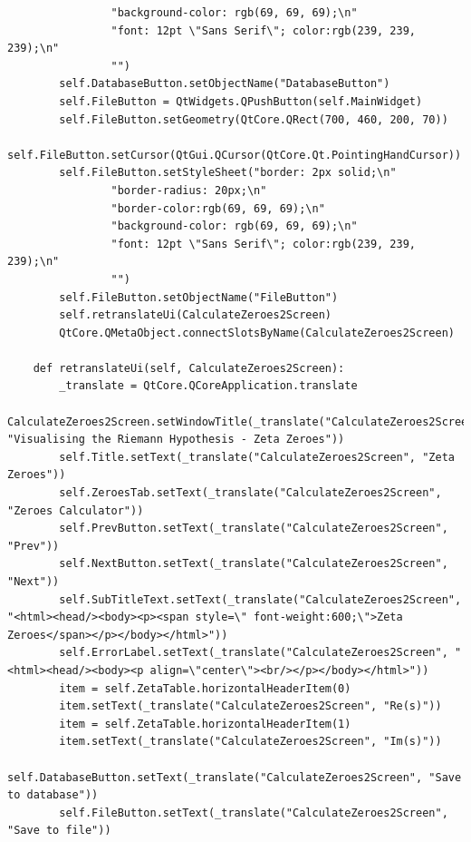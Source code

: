 \documentclass{article}
\begin{document}
\begin{lstlisting}
                "background-color: rgb(69, 69, 69);\n"
                "font: 12pt \"Sans Serif\"; color:rgb(239, 239, 239);\n"
                "")
        self.DatabaseButton.setObjectName("DatabaseButton")
        self.FileButton = QtWidgets.QPushButton(self.MainWidget)
        self.FileButton.setGeometry(QtCore.QRect(700, 460, 200, 70))
        self.FileButton.setCursor(QtGui.QCursor(QtCore.Qt.PointingHandCursor))
        self.FileButton.setStyleSheet("border: 2px solid;\n"
                "border-radius: 20px;\n"
                "border-color:rgb(69, 69, 69);\n"
                "background-color: rgb(69, 69, 69);\n"
                "font: 12pt \"Sans Serif\"; color:rgb(239, 239, 239);\n"
                "")
        self.FileButton.setObjectName("FileButton")
        self.retranslateUi(CalculateZeroes2Screen)
        QtCore.QMetaObject.connectSlotsByName(CalculateZeroes2Screen)

    def retranslateUi(self, CalculateZeroes2Screen):
        _translate = QtCore.QCoreApplication.translate
        CalculateZeroes2Screen.setWindowTitle(_translate("CalculateZeroes2Screen", "Visualising the Riemann Hypothesis - Zeta Zeroes"))
        self.Title.setText(_translate("CalculateZeroes2Screen", "Zeta Zeroes"))
        self.ZeroesTab.setText(_translate("CalculateZeroes2Screen", "Zeroes Calculator"))
        self.PrevButton.setText(_translate("CalculateZeroes2Screen", "Prev"))
        self.NextButton.setText(_translate("CalculateZeroes2Screen", "Next"))
        self.SubTitleText.setText(_translate("CalculateZeroes2Screen", "<html><head/><body><p><span style=\" font-weight:600;\">Zeta Zeroes</span></p></body></html>"))
        self.ErrorLabel.setText(_translate("CalculateZeroes2Screen", "<html><head/><body><p align=\"center\"><br/></p></body></html>"))
        item = self.ZetaTable.horizontalHeaderItem(0)
        item.setText(_translate("CalculateZeroes2Screen", "Re(s)"))
        item = self.ZetaTable.horizontalHeaderItem(1)
        item.setText(_translate("CalculateZeroes2Screen", "Im(s)"))
        self.DatabaseButton.setText(_translate("CalculateZeroes2Screen", "Save to database"))
        self.FileButton.setText(_translate("CalculateZeroes2Screen", "Save to file"))
\end{lstlisting}
\end{document}
